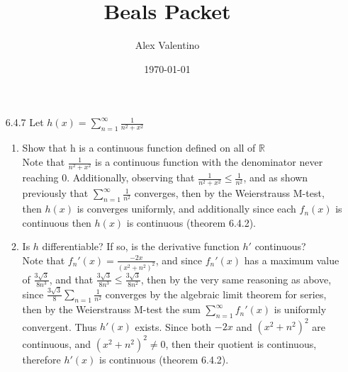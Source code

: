\documentclass[12pt, letterpaper]{article}
\date{\today}
\author{Alex Valentino}
\title{Beals Packet}
\newcommand{\R}{\mathbb{R}}
\begin{document}
\begin{enumerate}
	\item[6.4.7] Let $h(x) = \sum_{n=1}^\infty \frac{1}{n^2 + x^2}$
	\begin{enumerate}
		\item Show that h is a continuous function defined on all of $\R$\\
		Note that $\frac{1}{n^2 + x^2}$ is a continuous function with the denominator never reaching 0.  Additionally, 
		observing that $\frac{1}{n^2 + x^2} \leq \frac{1}{n^2}$, and as shown previously that $\sum_{n=1}^\infty \frac{1}{n^2}$ converges, then by the Weierstrauss M-test, then $h(x)$ is converges uniformly, and additionally since each $f_n(x)$
		is continuous then $h(x)$ is continuous (theorem 6.4.2).
		\item Is $h$ differentiable?  If so, is the derivative function $h'$ continuous?\\
		Note that $f_n'(x) = \frac{-2x}{(x^2+n^2)^2}$, and since $f_n'(x)$ has a maximum value of $\frac{3\sqrt{3}}{8n^3}$,
		and that $\frac{3\sqrt{3}}{8n^3} \leq \frac{3\sqrt{3}}{8n^2}$, then by the very same reasoning as above, since 
		$\frac{3\sqrt{3}}{8} \sum_{n=1}\frac{1}{n^2}$ converges by the algebraic limit theorem for series, then by the 
		Weierstrauss M-test the sum $\sum_{n=1}^\infty f_n'(x)$ is uniformly convergent.  Thus $h'(x)$ exists.  Since 
		both $-2x$ and $(x^2+n^2)^2$ are continuous, and $(x^2+n^2)^2 \neq 0$, then their quotient is continuous, therefore $h'(x)$ is continuous (theorem 6.4.2).
	\end{enumerate}
\end{enumerate}
\end{document}

